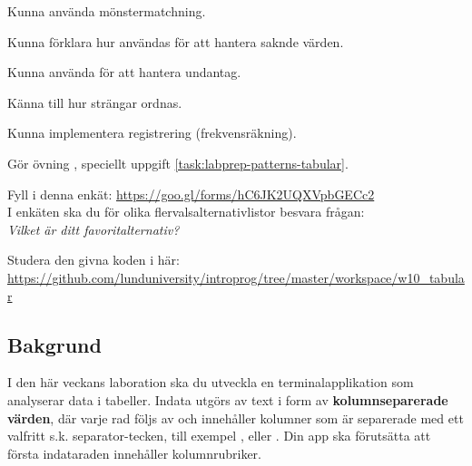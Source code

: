 
\Lab{\LabWeekTEN}

\begin{Goals}
\item Kunna använda mönstermatchning.
\item Kunna förklara hur  användas för att hantera saknde värden.
\item Kunna använda  för att hantera undantag.
\item Känna till hur strängar ordnas.
\item Kunna implementera registrering (frekvensräkning).
\end{Goals}

\begin{Preparations}
\item Gör övning {\texttt{\ExeWeekTEN}}, speciellt uppgift \ref{task:labprep-patterns-tabular}.
\item \ReadTheLab
\item Fyll i denna enkät: \url{https://goo.gl/forms/hC6JK2UQXVpbGECc2}  \\
I enkäten ska du för olika flervalsalternativlistor besvara frågan: \\ \textit{Vilket är ditt favoritalternativ?}
\item Studera den givna koden i  här: \url{https://github.com/lunduniversity/introprog/tree/master/workspace/w10_tabular}
\end{Preparations}


\subsection{Bakgrund}

I den här veckans laboration ska du utveckla en terminalapplikation som analyserar data i tabeller. Indata utgörs av text i form av \textbf{kolumnseparerade värden}, där varje rad följs av  och innehåller kolumner som är separerade med ett valfritt s.k. separator-tecken, till exempel ,  eller . Din app ska förutsätta att första indataraden innehåller kolumnrubriker.

